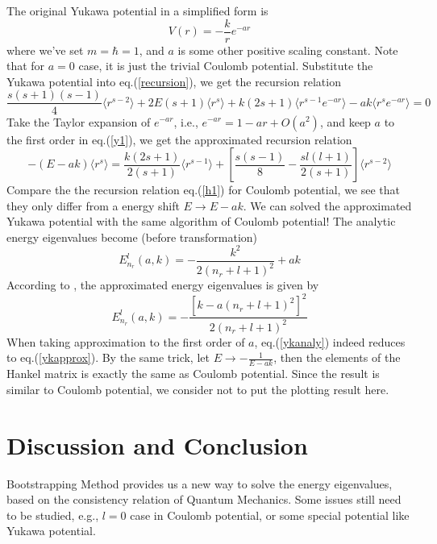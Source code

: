 \documentclass[10pt]{article}
\begin{document}
The original Yukawa potential in a simplified form is
\begin{equation}
    V(r)=-\frac{k}{r}e^{-ar}
\end{equation}
where we've set $m=\hbar=1$, and $a$ is some other positive scaling constant. Note that for $a=0$ case, it is just the trivial Coulomb potential. Substitute the Yukawa potential into eq.(\ref{recursion}), we get the recursion relation
\begin{equation}\label{y1}
    \frac{s(s+1)(s-1)}{4}\langle r^{s-2}\rangle + 2E(s+1)\langle r^s\rangle + k(2s+1)\langle r^{s-1}e^{-ar}\rangle - ak\langle r^s e^{-ar}\rangle=0
\end{equation}
Take the Taylor expansion of $e^{-ar}$, i.e., $e^{-ar}=1-ar+O(a^2)$, and keep $a$ to the first order in eq.(\ref{y1}), we get the approximated recursion relation
\begin{equation}
    -(E-ak)\langle r^s\rangle = 
    \frac{k(2s+1)}{2(s+1)}\langle r^{s-1}\rangle
    +[\frac{s(s-1)}{8}-\frac{sl(l+1)}{2(s+1)}]\langle r^{s-2}\rangle
\end{equation}
Compare the the recursion relation eq.(\ref{h1}) for Coulomb potential, we see that they only differ from a energy shift $E\rightarrow E-ak$. We can solved the approximated Yukawa potential with the same algorithm of Coulomb potential! The analytic energy eigenvalues become (before transformation)
\begin{equation}\label{ykapprox}
    E^l_{n_r}(a,k)=-\frac{k^2}{2(n_r+l+1)^2}+ak
\end{equation}
According to \cite{approxyukawa}, the approximated energy eigenvalues is given by
\begin{equation}\label{ykanaly}
    E^l_{n_r}(a,k)=-\frac{[k-a(n_r+l+1)^2]^2}{2(n_r+l+1)^2}
\end{equation}
When taking approximation to the first order of $a$, eq.(\ref{ykanaly}) indeed reduces to eq.(\ref{ykapprox}). By the same trick, let $E\rightarrow -\frac{1}{E-ak}$, then the elements of the Hankel matrix is exactly the same as Coulomb potential. Since the result is similar to Coulomb potential, we consider not to put the plotting result here.

\section{Discussion and Conclusion}\label{sec:5}
Bootstrapping Method provides us a new way to solve the energy eigenvalues, based on the consistency relation of Quantum Mechanics. Some issues still need to be studied, e.g., $l=0$ case in Coulomb potential, or some special potential like Yukawa potential.



\end{document}
